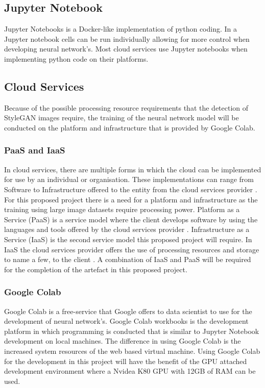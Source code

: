 \subsection{Jupyter Notebook}

Jupyter Notebooks is a Docker-like implementation of python coding. In a Jupyter notebook cells can be run individually allowing for more control when developing neural network's. Most cloud services use Jupyter notebooks when implementing python code on their platforms.

\subsection{Cloud Services}

Because of the possible processing resource requirements that the detection of StyleGAN images require, the training of the neural network model will be conducted on the platform and infrastructure that is provided by Google Colab.

\subsubsection{PaaS and IaaS}

In cloud services, there are multiple forms in which the cloud can be implemented for use by an individual or organisation. These implementations can range from Software to Infrastructure offered to the entity from the cloud services provider \citep{pfleeger2002}. For this proposed project there is a need for a platform and infrastructure as the training using large image datasets require processing power. Platform as a Service (PaaS) is a service model where the client develops software by using the languages and tools offered by the cloud services provider \citep{pfleeger2002}. Infrastructure as a Service (IaaS) is the second service model this proposed project will require. In IaaS the cloud services provider offers the use of processing resources and storage to name a few, to the client \citep{pfleeger2002}. A combination of IaaS and PaaS will be required for the completion of the artefact in this proposed project. 

\subsubsection{Google Colab}

Google Colab is a free-service that Google offers to data scientist to use for the development of neural network's. Google Colab workbooks is the development platform in which programming is conducted that is similar to Jupyter Notebook development on local machines. The difference in using Google Colab is the increased system resources of the web based virtual machine. Using Google Colab for the development in this project will have the benefit of the GPU attached development environment where a Nvidea K80 GPU with 12GB of RAM can be used.

